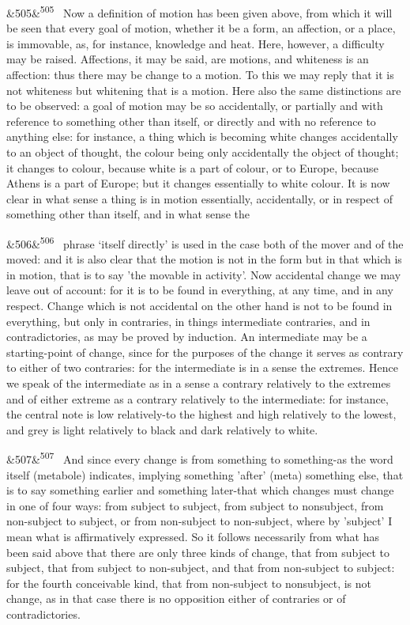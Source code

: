 \documentclass[12pt]{article}
\newcommand{\para}[1][]{\par\noindent\ifx&#1&\else\textsuperscript{\footnotesize #1}~\fi}
\begin{document}
\para[505] Now a definition of motion has been given above, from which it will be seen that every goal of motion, whether it be a form, an affection, or a place, is immovable, as, for instance, knowledge and heat. Here, however, a difficulty may be raised. Affections, it may be said, are motions, and whiteness is an affection: thus there may be change to a motion. To this we may reply that it is not whiteness but whitening that is a motion. Here also the same distinctions are to be observed: a goal of motion may be so accidentally, or partially and with reference to something other than itself, or directly and with no reference to anything else: for instance, a thing which is becoming white changes accidentally to an object of thought, the colour being only accidentally the object of thought; it changes to colour, because white is a part of colour, or to Europe, because Athens is a part of Europe; but it changes essentially to white colour. It is now clear in what sense a thing is in motion essentially, accidentally, or in respect of something other than itself, and in what sense the

\para[506] phrase ‘itself directly' is used in the case both of the mover and of the moved: and it is also clear that the motion is not in the form but in that which is in motion, that is to say 'the movable in activity'. Now accidental change we may leave out of account: for it is to be found in everything, at any time, and in any respect. Change which is not accidental on the other hand is not to be found in everything, but only in contraries, in things intermediate contraries, and in contradictories, as may be proved by induction. An intermediate may be a starting-point of change, since for the purposes of the change it serves as contrary to either of two contraries: for the intermediate is in a sense the extremes. Hence we speak of the intermediate as in a sense a contrary relatively to the extremes and of either extreme as a contrary relatively to the intermediate: for instance, the central note is low relatively-to the highest and high relatively to the lowest, and grey is light relatively to black and dark relatively to white.

\para[507] And since every change is from something to something-as the word itself (metabole) indicates, implying something 'after' (meta) something else, that is to say something earlier and something later-that which changes must change in one of four ways: from subject to subject, from subject to nonsubject, from non-subject to subject, or from non-subject to non-subject, where by 'subject' I mean what is affirmatively expressed. So it follows necessarily from what has been said above that there are only three kinds of change, that from subject to subject, that from subject to non-subject, and that from non-subject to subject: for the fourth conceivable kind, that from non-subject to nonsubject, is not change, as in that case there is no opposition either of contraries or of contradictories.
\end{document}
